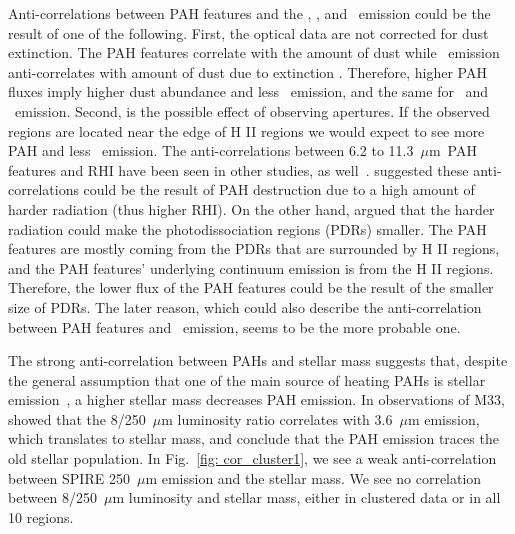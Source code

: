         Anti-correlations between PAH features and the \halpha, \sii, and \oiii~emission could be the result of one of the following. 
        First, the optical data are not corrected for dust extinction.
        The PAH features correlate with the amount of dust while \halpha~emission anti-correlates with amount of dust due to extinction \citep{Calzetti94}.
        Therefore, higher PAH fluxes imply higher dust abundance and less \halpha~emission, and the same for \sii~and \oiii~emission.
        Second, is the possible effect of observing apertures.
        If the observed regions are located near the edge of H {\sc II} regions we would expect to see more PAH and less \halpha~emission. %
        The anti-correlations between 6.2 to 11.3~$\mu$m~PAH features and RHI have been seen in other studies, as well~\citep[e.g.][]{Dim15, Gordon08, Wu06}.
        \cite{Wu06} suggested these anti-correlations could be the result of PAH destruction due to a high amount of harder radiation (thus higher RHI).
        On the other hand, \cite{Gordon08} argued that the harder radiation could make the photodissociation regions (PDRs) smaller.
        The PAH features are mostly coming from the PDRs that are surrounded by H {\sc II} regions, and the PAH features' underlying continuum emission is from the H {\sc II} regions.
        Therefore, the lower flux of the PAH features could be the result of the smaller size of PDRs.
        The later reason, which could also describe the anti-correlation between PAH features and \halpha~emission, seems to be the more probable one. 
        
        The strong anti-correlation between PAHs and stellar mass suggests that, despite the general assumption that one of the main source of heating PAHs is stellar emission~\citep[e.g][]{Haas02,Bendo08,Calapa14, Lu14,Jones15}, a higher stellar mass decreases PAH emission.
        In observations of M33,~\cite{Calapa14} showed that the 8/250~$\mu$m luminosity ratio correlates with 3.6~$\mu$m emission, which translates to stellar mass, and conclude that the PAH emission traces the old stellar population.
        In Fig.~\ref{fig: cor_cluster1}, we see a weak anti-correlation between SPIRE 250~$\mu$m emission and the stellar mass.
        We see no correlation between 8/250~$\mu$m luminosity and stellar mass, either in clustered data or in all 10 regions.
        
